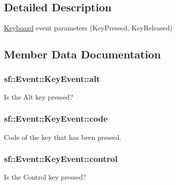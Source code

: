 \subsection{Detailed Description}
\hyperlink{classsf_1_1_keyboard}{Keyboard} event parameters (Key\-Pressed, Key\-Released) 

\subsection{Member Data Documentation}
\hypertarget{structsf_1_1_event_1_1_key_event_a915a483317de67d995188a855701fbd7}{
\subsubsection[{alt}]{ sf\-::\-Event\-::\-Key\-Event\-::alt}}\label{structsf_1_1_event_1_1_key_event_a915a483317de67d995188a855701fbd7}


Is the Alt key pressed? 

\hypertarget{structsf_1_1_event_1_1_key_event_a2879fdab8a68cb1c6ecc45730a2d0e61}{
\subsubsection[{code}]{ sf\-::\-Event\-::\-Key\-Event\-::code}}\label{structsf_1_1_event_1_1_key_event_a2879fdab8a68cb1c6ecc45730a2d0e61}


Code of the key that has been pressed. 

\hypertarget{structsf_1_1_event_1_1_key_event_a9255861c2f88501d80ad6b44a310b62f}{
\subsubsection[{control}]{ sf\-::\-Event\-::\-Key\-Event\-::control}}\label{structsf_1_1_event_1_1_key_event_a9255861c2f88501d80ad6b44a310b62f}


Is the Control key pressed? 


